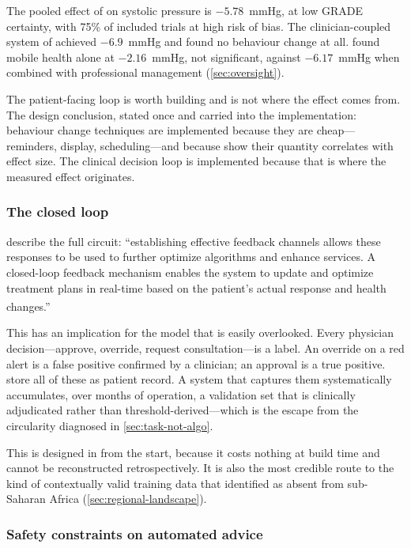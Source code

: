 \documentclass[12pt,a4paper,oneside]{report}
\newcommand{\bq}[1]{``#1''\textsuperscript{\dag}}
\begin{document}
The pooled effect of \textcite{zhou2024} on systolic pressure is $-5.78$~mmHg, at low GRADE certainty, with 75\% of included trials at high risk of bias. The clinician-coupled system of \textcite{mihevc2025} achieved $-6.9$~mmHg and found no behaviour change at all. \Textcite{mao2020} found mobile health alone at $-2.16$~mmHg, not significant, against $-6.17$~mmHg when combined with professional management (\cref{sec:oversight}).

The patient-facing loop is worth building and is not where the effect comes from. The design conclusion, stated once and carried into the implementation: behaviour change techniques are implemented because they are cheap---reminders, display, scheduling---and because \textcite{zhou2024} show their quantity correlates with effect size. The clinical decision loop is implemented because that is where the measured effect originates.

\subsubsection{The closed loop}\label{sec:closed-loop}

\Textcite{liu2025review} describe the full circuit: \bq{establishing effective feedback channels allows these responses to be used to further optimize algorithms and enhance services. A closed-loop feedback mechanism enables the system to update and optimize treatment plans in real-time based on the patient's actual response and health changes.}

This has an implication for the model that is easily overlooked. Every physician decision---approve, override, request consultation---is a label. An override on a red alert is a false positive confirmed by a clinician; an approval is a true positive. \Textcite{yazdani2018} store all of these as patient record. A system that captures them systematically accumulates, over months of operation, a validation set that is clinically adjudicated rather than threshold-derived---which is the escape from the circularity diagnosed in \cref{sec:task-not-algo}.

This is designed in from the start, because it costs nothing at build time and cannot be reconstructed retrospectively. It is also the most credible route to the kind of contextually valid training data that \textcite{segun2025} identified as absent from sub-Saharan Africa (\cref{sec:regional-landscape}).

\subsubsection{Safety constraints on automated advice}\label{sec:safety}
\end{document}
